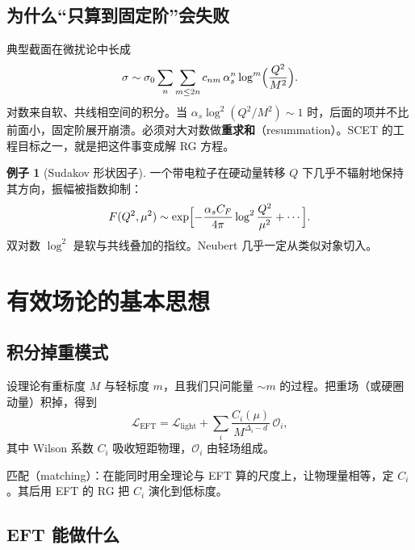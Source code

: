 \documentclass[11pt,a4paper]{article}
\theoremstyle{definition}
\newtheorem{example}{例子}[section]
\theoremstyle{plain}
\theoremstyle{remark}
\begin{document}
\subsection{为什么``只算到固定阶''会失败}

典型截面在微扰论中长成
\begin{equation}
\label{eq:sudakov-series}
  \sigma\sim \sigma_0\sum_{n}\sum_{m\le 2n}
  c_{nm}\,\alpha_s^n\log^m\Bigl(\frac{Q^2}{M^2}\Bigr).
\end{equation}
对数来自软、共线相空间的积分。当 $\alpha_s\log^2(Q^2/M^2)\sim 1$ 时，后面的项并不比前面小，固定阶展开崩溃。必须对大对数做\textbf{重求和}（resummation）。SCET 的工程目标之一，就是把这件事变成解 RG 方程。

\begin{example}[Sudakov 形状因子]
一个带电粒子在硬动量转移 $Q$ 下几乎不辐射地保持其方向，振幅被指数抑制：
\begin{equation}
  F(Q^2,\mu^2)\sim \exp\Bigl[-\frac{\alpha_s C_F}{4\pi}\log^2\frac{Q^2}{\mu^2}+\cdots\Bigr].
\end{equation}
双对数 $\log^2$ 是软与共线叠加的指纹。Neubert 几乎一定从类似对象切入。
\end{example}

\section{有效场论的基本思想}
\label{sec:eft}

\subsection{积分掉重模式}

设理论有重标度 $M$ 与轻标度 $m$，且我们只问能量 $\sim m$ 的过程。把重场（或硬圈动量）积掉，得到
\begin{equation}
  \mathcal{L}_{\mathrm{EFT}}=\mathcal{L}_{\mathrm{light}}+\sum_i \frac{C_i(\mu)}{M^{\Delta_i-d}}\,\mathcal{O}_i,
\end{equation}
其中 Wilson 系数 $C_i$ 吸收短距物理，$\mathcal{O}_i$ 由轻场组成。

匹配（matching）：在能同时用全理论与 EFT 算的尺度上，让物理量相等，定 $C_i$。其后用 EFT 的 RG 把 $C_i$ 演化到低标度。

\subsection{EFT 能做什么}
\end{document}
